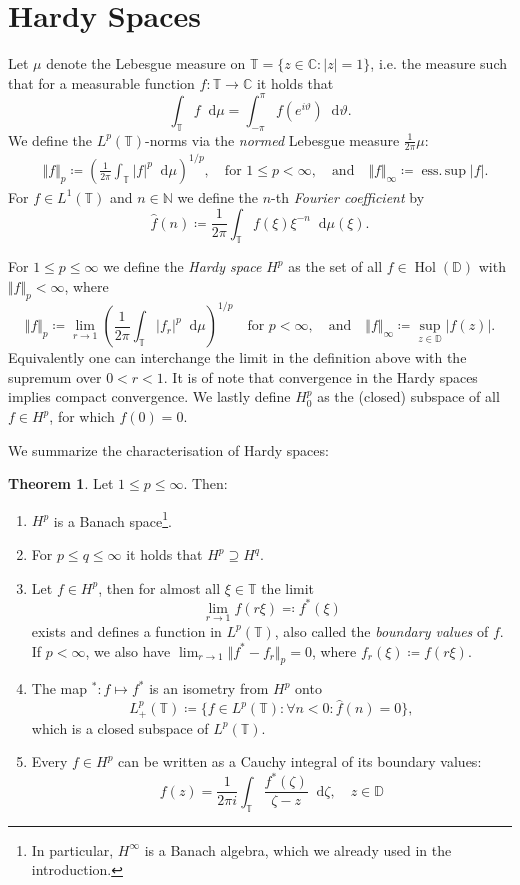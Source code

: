 \documentclass[letterpaper, 11pt]{article}
\newcommand{\C}{\mathbb{C}}
\newcommand{\D}{\mathbb{D}}
\newcommand{\T}{\mathbb{T}}
\newcommand{\N}{\mathbb{N}}
\newcommand{\1}{\mathds{1}}
\newcommand{\dd}{\mathop{}\!\mathrm{d}}
\DeclareMathOperator*{\Hol}{Hol}
\DeclareMathOperator*{\esssup}{ess.\,sup}
\theoremstyle{definition}
\newtheorem{theorem}{Theorem}
\begin{document}
\section{Hardy Spaces}

Let $\mu$ denote the Lebesgue measure on $\T = \{ z \in \C : \vert z \vert = 1 \}$, i.e. the measure such that for a measurable function $f : \T \to \C$ it holds that
$$ \int_\T f \dd \mu = \int_{-\pi}^\pi f(e^{i \vartheta}) \dd \vartheta. $$
We define the $L^p(\T)$-norms via the \emph{normed} Lebesgue measure $\frac{1}{2 \pi} \mu$:
\begin{align*}
  &\Vert f \Vert_p \coloneqq \left( \frac{1}{2\pi} \int_\T \vert f \vert^p \dd \mu \right)^{1/p}, \quad \textrm{for } 1 \leq p < \infty, \quad \textrm{and} \quad \Vert f \Vert_\infty \coloneqq \esssup \vert f \vert.
\end{align*}
For $f \in L^1(\T)$ and $n \in \N$ we define the $n$-th \emph{Fourier coefficient} by
$$ \hat{f}(n) \coloneqq \frac{1}{2\pi} \int_\T f(\xi) \xi^{-n} \dd \mu(\xi). $$

For $1 \leq p \leq \infty$ we define the \emph{Hardy space} $H^p$ as the set of all $f \in \Hol(\D)$ with $\Vert f \Vert_p < \infty$, where
$$ \Vert f \Vert_p \coloneqq \lim_{r \to 1} \left( \frac{1}{2 \pi} \int_\T \vert f_r \vert^p \dd \mu \right)^{1/p} \quad \textrm{for } p < \infty, \quad \textrm{and} \quad \Vert f \Vert_\infty \coloneqq \sup_{z \in \D} \vert f(z) \vert. $$
Equivalently one can interchange the limit in the definition above with the supremum over $0 < r < 1$.
It is of note that convergence in the Hardy spaces implies compact convergence.
We lastly define $H_0^p$ as the (closed) subspace of all $f \in H^p$, for which $f(0) = 0$.

We summarize the characterisation of Hardy spaces:
\begin{theorem} Let $1 \leq p \leq \infty$. Then:
  \begin{enumerate}
    \item $H^p$ is a Banach space\footnote{In particular, $H^\infty$ is a Banach algebra, which we already used in the introduction.}.
    \item For $p \leq q \leq \infty$ it holds that $H^p \supseteq H^q$.
    \item Let $f \in H^p$, then for almost all $\xi \in \T$ the limit
    $$ \lim_{r \to 1} f(r\xi) \eqqcolon f^*(\xi) $$
    exists and defines a function in $L^p(\T)$, also called the \emph{boundary values} of $f$. If $p < \infty$, we also have $ \lim_{r \to 1} \Vert f^* - f_r \Vert_p = 0 $, where $f_r(\xi) \coloneqq f(r \xi)$.
    \item The map ${}^* : f \mapsto f^*$ is an isometry from $H^p$ onto
    $$ L^p_+(\T) \coloneqq \{ f \in L^p(\T) : \forall n < 0: \hat{f}(n) = 0 \}, $$
    which is a closed subspace of $L^p(\T)$.
    \item Every $f \in H^p$ can be written as a Cauchy integral of its boundary values:
    $$ f(z) = \frac{1}{2 \pi i} \int_\T \frac{f^*(\zeta)}{\zeta - z} \dd \zeta, \quad z \in \D $$
  \end{enumerate}
\end{theorem}
\end{document}
